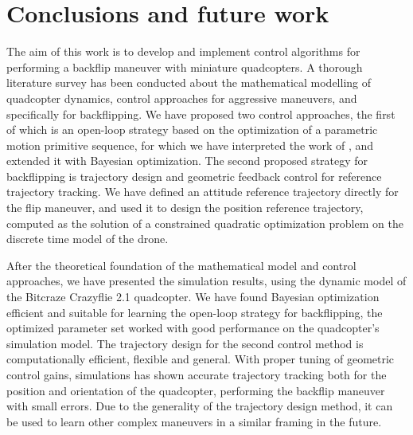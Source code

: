 
\section{Conclusions and future work}
The aim of this work is to develop and implement control algorithms for performing a backflip maneuver with miniature quadcopters. A thorough literature survey has been conducted about the mathematical modelling of quadcopter dynamics, control approaches for aggressive maneuvers, and specifically for backflipping. We have proposed two control approaches, the first of which is an open-loop strategy based on the optimization of a parametric motion primitive sequence, for which we have interpreted the work of \cite{LSICRA2010}, and extended it with Bayesian optimization. %
The second proposed strategy for backflipping is trajectory design and geometric feedback control for reference trajectory tracking. %
We have defined an attitude reference trajectory directly for the flip maneuver, and used it to design the position reference trajectory, computed as the solution of a constrained quadratic optimization problem on the discrete time model of the drone. %

After the theoretical foundation of the mathematical model and control approaches, we have presented the simulation results, using the dynamic model of the Bitcraze Crazyflie 2.1 quadcopter. We have found Bayesian optimization efficient and suitable for learning the open-loop strategy for backflipping, the optimized parameter set worked with good performance on the quadcopter's simulation model. The trajectory design for the second control method is computationally efficient, flexible and general. With proper tuning of geometric control gains, simulations has shown accurate trajectory tracking both for the position and orientation of the quadcopter, performing the backflip maneuver with small errors. Due to the generality of the trajectory design method, it can be used to learn other complex maneuvers in a similar framing in the future.

